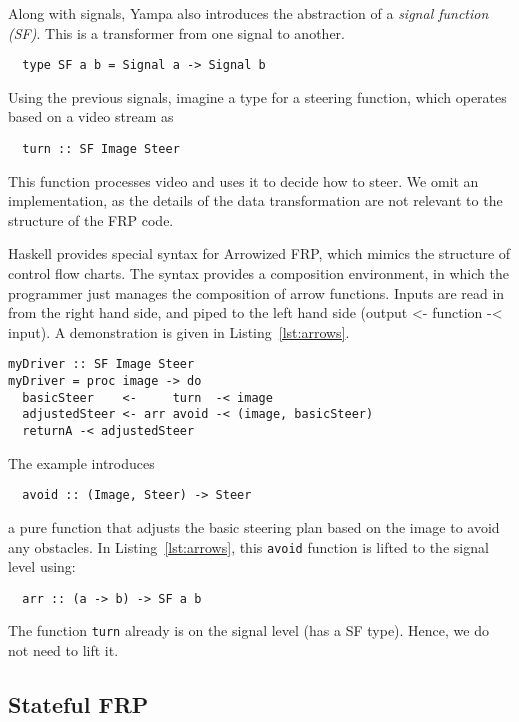 Along with signals, Yampa also introduces the abstraction of a \textit{signal function (SF)}.
This is a transformer from one signal to another.

\begin{lstlisting}
  type SF a b = Signal a -> Signal b
\end{lstlisting}

\noindent Using the previous signals, imagine a type for a steering function, which operates based on a video stream as

\begin{lstlisting}
  turn :: SF Image Steer
\end{lstlisting}

\noindent This function processes video and uses it to decide how to steer.
We omit an implementation, as the details of the data transformation are not relevant to the structure of the FRP code.

Haskell provides special syntax for Arrowized FRP, which mimics the structure of control flow charts.
The syntax provides a composition environment, in which the programmer just manages the composition of arrow functions.
Inputs are read in from the right hand side, and piped to the left hand side (output <- function -< input).
A demonstration is given in Listing~\ref{lst:arrows}.

\begin{lstlisting}[float,floatplacement=h!,caption=Basic Arrowized FRP syntax,label=lst:arrows]
myDriver :: SF Image Steer
myDriver = proc image -> do
  basicSteer    <-     turn  -< image
  adjustedSteer <- arr avoid -< (image, basicSteer)
  returnA -< adjustedSteer
\end{lstlisting}

The example introduces 
%
\begin{lstlisting}
  avoid :: (Image, Steer) -> Steer
\end{lstlisting}
%
a pure function that adjusts the basic steering plan based on the image to avoid any obstacles.
In Listing~\ref{lst:arrows}, this \texttt{avoid} function is lifted to the signal level using:
%
\begin{lstlisting}
  arr :: (a -> b) -> SF a b
\end{lstlisting}
%
The function \texttt{turn} already is on the signal level (has a SF type). Hence, we do not need to lift it.

\subsection{Stateful FRP}

